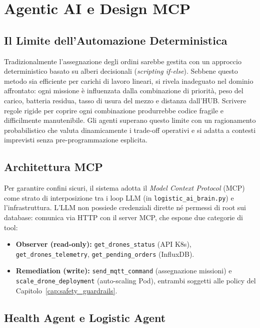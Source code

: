 
\chapter{Agentic AI e Design MCP}
\label{cap:agentic_operations_mcp}

\section{Il Limite dell'Automazione Deterministica}
\label{sec:limite_automazione}

Tradizionalmente l'assegnazione degli ordini sarebbe gestita con un approccio deterministico basato su alberi decisionali (\textit{scripting if-else}). Sebbene questo metodo sia efficiente per carichi di lavoro lineari, si rivela inadeguato nel dominio affrontato: ogni missione è influenzata dalla combinazione di priorità, peso del carico, batteria residua, tasso di usura del mezzo e distanza dall'HUB. Scrivere regole rigide per coprire ogni combinazione produrrebbe codice fragile e difficilmente manutenibile. Gli agenti superano questo limite con un ragionamento probabilistico che valuta dinamicamente i trade-off operativi e si adatta a contesti imprevisti senza pre-programmazione esplicita.

\section{Architettura MCP}
\label{sec:architettura_mcp}

Per garantire confini sicuri, il sistema adotta il \textit{Model Context Protocol} (MCP) come strato di interposizione tra i loop LLM (in \texttt{logistic\_ai\_brain.py}) e l'infrastruttura. L'LLM non possiede credenziali dirette né permessi di root sui database: comunica via HTTP con il server MCP, che espone due categorie di tool:
\begin{itemize}
    \item \textbf{Observer (read-only):} \texttt{get\_drones\_status} (API K8s), \texttt{get\_drones\_telemetry}, \texttt{get\_pending\_orders} (InfluxDB).
    \item \textbf{Remediation (write):} \texttt{send\_mqtt\_command} (assegnazione missioni) e \texttt{scale\_drone\_deployment} (auto-scaling Pod), entrambi soggetti alle policy del Capitolo~\ref{cap:safety_guardrails}.
\end{itemize}

\section{Health Agent e Logistic Agent}
\label{sec:agenti}

